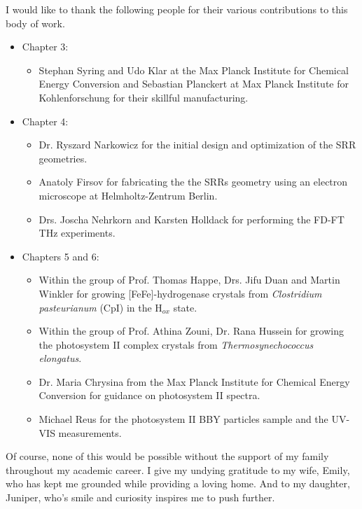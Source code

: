 I would like to thank the following people for their various contributions to this body of work. 
\begin{itemize}
    \item Chapter 3: 
    \begin{itemize}
        \item Stephan Syring and Udo Klar at the Max Planck Institute for Chemical Energy Conversion and Sebastian Planckert at Max Planck Institute for Kohlenforschung for their skillful manufacturing.
    \end{itemize}
    \item Chapter 4:
    \begin{itemize}
        \item Dr. Ryszard Narkowicz for the initial design and optimization of the SRR geometries. 
        \item Anatoly Firsov for fabricating the the SRRs geometry using an electron microscope at Helmholtz-Zentrum Berlin. 
        \item Drs. Joscha Nehrkorn and Karsten Holldack for performing the FD-FT THz experiments.
    \end{itemize}
    \item Chapters 5 and 6:
    \begin{itemize}
        \item Within the group of Prof. Thomas Happe, Drs. Jifu Duan and Martin Winkler for growing [FeFe]-hydrogenase crystals from {\em Clostridium pasteurianum} (CpI) in the H$_{ox}$ state.
        \item Within the group of Prof. Athina Zouni, Dr. Rana Hussein for growing the photosystem II complex crystals from {\em Thermosynechococcus elongatus}. 
        \item Dr. Maria Chrysina from the Max Planck Institute for Chemical Energy Conversion for guidance on photosystem II spectra.
        \item Michael Reus for the photosystem II BBY particles sample and the UV-VIS measurements.     
    \end{itemize}
\end{itemize}

Of course, none of this would be possible without the support of my family throughout my academic career. I give my undying gratitude to my wife, Emily, who has kept me grounded while providing a loving home. And to my daughter, Juniper, who's smile and curiosity inspires me to push further.
 